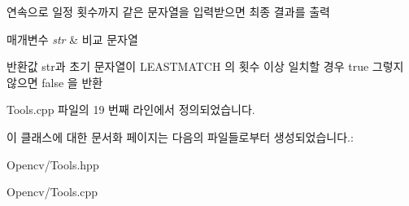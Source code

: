 연속으로 일정 횟수까지 같은 문자열을 입력받으면 최종 결과를 출력 


\begin{DoxyParams}{매개변수}
{\em str} & 비교 문자열 \\
\hline
\end{DoxyParams}
\begin{DoxyReturn}{반환값}
str과 초기 문자열이 L\+E\+A\+S\+T\+M\+A\+T\+CH 의 횟수 이상 일치할 경우 true 그렇지 않으면 false 을 반환 
\end{DoxyReturn}


Tools.\+cpp 파일의 19 번째 라인에서 정의되었습니다.



이 클래스에 대한 문서화 페이지는 다음의 파일들로부터 생성되었습니다.\+:\begin{DoxyCompactItemize}
\item 
Opencv/Tools.\+hpp\item 
Opencv/Tools.\+cpp\end{DoxyCompactItemize}
